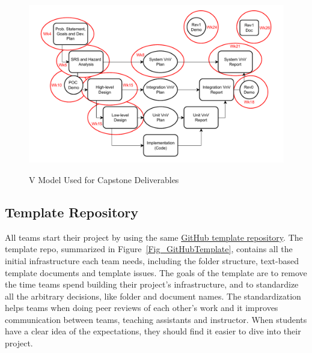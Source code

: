 \documentclass[10pt, conference]{IEEEtran}
\begin{document}
\begin{figure}[h!]
  \hspace{-0.6cm}
    {
      \includegraphics[width=1.1\columnwidth]{./figures/CourseStructure.drawio.pdf}
    }
    \caption{\label{Fig_VModel} V Model Used for Capstone Deliverables}
\end{figure}
\subsection{Template Repository} \label{Sec_Template}

All teams start their project by using the same
\href{REDACTED Link} {GitHub template repository}. The template repo, summarized
in Figure~\ref{Fig_GitHubTemplate}, contains all the initial infrastructure each
team needs, including the folder structure, text-based template documents and
template issues. The goals of the template are to remove the time teams spend
building their project's infrastructure, and to standardize all the arbitrary
decisions, like folder and document names. The
standardization helps teams when doing peer reviews of each other's work and it
improves communication between teams, teaching assistants and instructor.
When students have a clear idea of the expectations, they should find it easier
to dive into their project.
\end{document}
